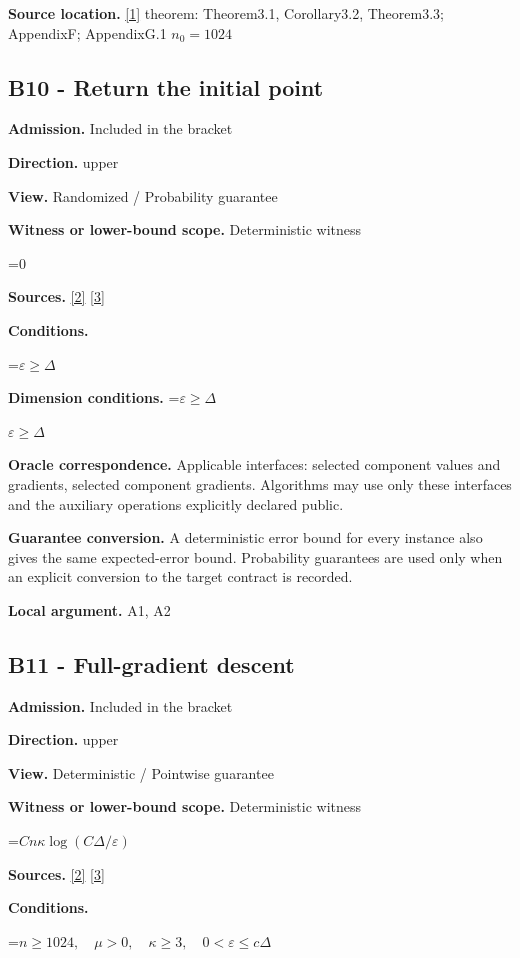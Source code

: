 \documentclass[10pt,a4paper]{article}
\newcommand{\AtlasMath}[1]{\par\begingroup\centering\setbox0=\hbox{$\displaystyle #1$}\ifdim\wd0>1.4\linewidth\typeout{ATLAS WIDE FORMULA: \the\wd0}\fi\ifdim\wd0>\linewidth\resizebox{\linewidth}{!}{\box0}\else\box0\fi\par\endgroup}
\newcommand{\AtlasInlineMath}[1]{\begingroup\setbox0=\hbox{$#1$}\ifdim\wd0>.4\linewidth\endgroup\AtlasMath{#1}\else\endgroup$#1$\fi}
\begin{document}
\textbf{Source location.} \href{https://arxiv.org/pdf/2609.00045v3}{[1]} theorem: Theorem3.1, Corollary3.2, Theorem3.3; AppendixF; AppendixG.1 $n_0=1024$

\subsection{B10 - Return the initial point}
\textbf{Admission.} Included in the bracket

\textbf{Direction.} upper

\textbf{View.} Randomized / Probability guarantee

\textbf{Witness or lower-bound scope.} Deterministic witness

\AtlasMath{0}
\textbf{Sources.} \href{https://proceedings.mlr.press/v97/zhou19b/zhou19b.pdf}{[2]} \href{https://arxiv.org/pdf/1405.4980}{[3]}

\textbf{Conditions.} 
\AtlasMath{\varepsilon\ge\Delta}


\textbf{Dimension conditions.} \AtlasInlineMath{\varepsilon\ge\Delta}

\textbf{Oracle correspondence.} Applicable interfaces: selected component values and gradients, selected component gradients. Algorithms may use only these interfaces and the auxiliary operations explicitly declared public.

\textbf{Guarantee conversion.} A deterministic error bound for every instance also gives the same expected-error bound. Probability guarantees are used only when an explicit conversion to the target contract is recorded.

\textbf{Local argument.} A1, A2

\subsection{B11 - Full-gradient descent}
\textbf{Admission.} Included in the bracket

\textbf{Direction.} upper

\textbf{View.} Deterministic / Pointwise guarantee

\textbf{Witness or lower-bound scope.} Deterministic witness

\AtlasMath{Cn\kappa\log(C\Delta/\varepsilon)}
\textbf{Sources.} \href{https://proceedings.mlr.press/v97/zhou19b/zhou19b.pdf}{[2]} \href{https://arxiv.org/pdf/1405.4980}{[3]}

\textbf{Conditions.} 
\AtlasMath{n\ge1024,\quad\mu>0,\quad\kappa\ge3,\quad0<\varepsilon\le c\Delta}
\end{document}
